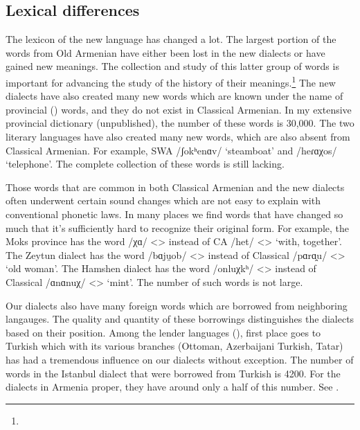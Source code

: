 \subsection{Lexical differences}

The lexicon of the new language has changed a lot. The largest portion of the words from Old Armenian have either been lost in the new dialects or have gained new meanings. The collection and study of this latter group of words is important for advancing the study of the history of their meanings.\footnote{} The new dialects have also created many new words which are known under the name of provincial () words, and they do not exist in Classical Armenian. In my extensive provincial dictionary (unpublished), the number of these words is 30,000. The two literary languages have also created many new words, which are also absent from Classical Armenian. For example, SWA /ʃokʰenɑv/  `steamboat' and /heɾɑχos/  `telephone'. The complete collection of these words is still lacking.


\begin{adjarianpage}\label{page:19}\end{adjarianpage}%

Those words that are common in both Classical Armenian and the new dialects often underwent certain sound changes which are not easy to explain with conventional phonetic laws. In many places we find words that have changed so much that it's sufficiently hard to recognize their original form. For example, the Moks province has the word /χɑ/ <> instead of CA /het/ <> `with, together'. The Zeytun dialect has the word /bɑju̯ob/ <> instead of Classical /pɑrɑ̯u/ <> `old woman'. The Hamshen dialect has the word /onluχkʰ/ <> instead of Classical /ɑnɑnuχ/ <> `mint'. The number of such words is not large. 

Our dialects also have many foreign words which are borrowed from neighboring langauges. The quality and quantity of these borrowings distinguishes the dialects based on their position. Among the lender languages (), first place goes to Turkish which with its various branches (Ottoman, Azerbaijani Turkish, Tatar) has had a tremendous influence on our dialects without exception. The number of words in the Istanbul dialect that were borrowed from Turkish is 4200. For the dialects in Armenia proper, they have around only a half of this number. See \citet{Adjarian-1902-TUrkishWordsArmenian}. 

